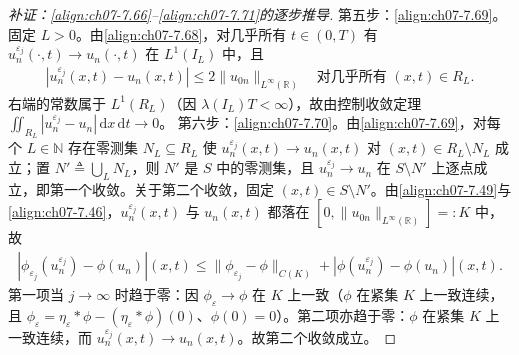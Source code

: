 ﻿\documentclass[../../main.tex]{subfiles}%
\begin{document}
\begin{proof}[补证：\eqref{align:ch07-7.66}--\eqref{align:ch07-7.71}的逐步推导]
第五步：\eqref{align:ch07-7.69}。固定 $L>0$。由\eqref{align:ch07-7.68}，对几乎所有 $t\in(0,T)$ 有 $u_n^{\varepsilon_j}(\cdot,t)\to u_n(\cdot,t)$ 在 $L^1(I_L)$ 中，且
\begin{align*}
|u_n^{\varepsilon_j}(x,t)-u_n(x,t)|\leqslant2\|u_{0n}\|_{L^\infty(\mathbb{R})}\quad\text{对几乎所有 }(x,t)\in R_L.
\end{align*}
右端的常数属于 $L^1(R_L)$（因 $\lambda(I_L)T<\infty$），故由控制收敛定理 $\iint_{R_L}|u_n^{\varepsilon_j}-u_n|\,\mathrm{d}x\,\mathrm{d}t\to0$。
第六步：\eqref{align:ch07-7.70}。由\eqref{align:ch07-7.69}，对每个 $L\in\mathbb{N}$ 存在零测集 $N_L\subseteq R_L$ 使 $u_n^{\varepsilon_j}(x,t)\to u_n(x,t)$ 对 $(x,t)\in R_L\setminus N_L$ 成立；置 $N'\triangleq\bigcup_LN_L$，则 $N'$ 是 $S$ 中的零测集，且 $u_n^{\varepsilon_j}\to u_n$ 在 $S\setminus N'$ 上逐点成立，即第一个收敛。关于第二个收敛，固定 $(x,t)\in S\setminus N'$。由\eqref{align:ch07-7.49}与\eqref{align:ch07-7.46}，$u_n^{\varepsilon_j}(x,t)$ 与 $u_n(x,t)$ 都落在 $[0,\|u_{0n}\|_{L^\infty(\mathbb{R})}]=:K$ 中，故
\begin{align*}
|\phi_{\varepsilon_j}(u_n^{\varepsilon_j})-\phi(u_n)|(x,t)
\leqslant\|\phi_{\varepsilon_j}-\phi\|_{C(K)}
+|\phi(u_n^{\varepsilon_j})-\phi(u_n)|(x,t).
\end{align*}
第一项当 $j\to\infty$ 时趋于零：因 $\phi_\varepsilon\to\phi$ 在 $K$ 上一致（$\phi$ 在紧集 $K$ 上一致连续，且 $\phi_\varepsilon=\eta_\varepsilon*\phi-(\eta_\varepsilon*\phi)(0)$、$\phi(0)=0$）。第二项亦趋于零：$\phi$ 在紧集 $K$ 上一致连续，而 $u_n^{\varepsilon_j}(x,t)\to u_n(x,t)$。故第二个收敛成立。
\end{proof}
\end{document}
